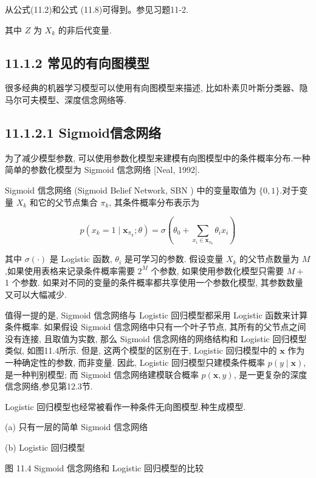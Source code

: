 \documentclass[10pt]{article}
\begin{document}
从公式(11.2)和公式 (11.8)可得到。参见习题11-2.

其中 $Z$ 为 $X_{k}$ 的非后代变量.

\subsection*{11.1.2 常见的有向图模型}
很多经典的机器学习模型可以使用有向图模型来描述, 比如朴素贝叶斯分类器、隐马尔可夫模型、深度信念网络等.

\subsection*{11.1.2.1 Sigmoid信念网络}
为了减少模型参数, 可以使用参数化模型来建模有向图模型中的条件概率分布.一种简单的参数化模型为 Sigmoid 信念网络 [Neal, 1992].

Sigmoid 信念网络 (Sigmoid Belief Network, SBN ) 中的变量取值为 $\{0,1\}$.对于变量 $X_{k}$ 和它的父节点集合 $\pi_{k}$, 其条件概率分布表示为


\begin{equation*}
p\left(x_{k}=1 \mid \boldsymbol{x}_{\pi_{k}} ; \theta\right)=\sigma\left(\theta_{0}+\sum_{x_{i} \in \boldsymbol{x}_{\pi_{k}}} \theta_{i} x_{i}\right) \tag{11.10}
\end{equation*}


其中 $\sigma(\cdot)$ 是 Logistic 函数, $\theta_{i}$ 是可学习的参数. 假设变量 $X_{k}$ 的父节点数量为 $M$,如果使用表格来记录条件概率需要 $2^{M}$ 个参数, 如果使用参数化模型只需要 $M+$ 1 个参数. 如果对不同的变量的条件概率都共享使用一个参数化模型, 其参数数量又可以大幅减少.

值得一提的是, Sigmoid 信念网络与 Logistic 回归模型都采用 Logistic 函数来计算条件概率. 如果假设 Sigmoid 信念网络中只有一个叶子节点, 其所有的父节点之间没有连接, 且取值为实数, 那么 Sigmoid 信念网络的网络结构和 Logistic 回归模型类似, 如图11.4所示. 但是, 这两个模型的区别在于, Logistic 回归模型中的 $\boldsymbol{x}$ 作为一种确定性的参数, 而非变量. 因此, Logistic 回归模型只建模条件概率 $p(y \mid \boldsymbol{x})$, 是一种判别模型; 而 Sigmoid 信念网络建模联合概率 $p(\boldsymbol{x}, y)$, 是一更复杂的深度信念网络,参见第12.3节.

Logistic 回归模型也经常被看作一种条件无向图模型.种生成模型.



(a) 只有一层的简单 Sigmoid 信念网络



(b) Logistic 回归模型

图 11.4 Sigmoid 信念网络和 Logistic 回归模型的比较
\end{document}
